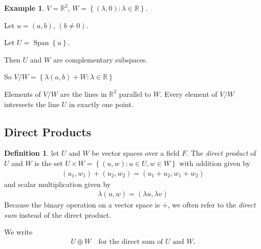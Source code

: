 \documentclass{article}
\theoremstyle{definition} \newtheorem*{definition}{Definition}
\newtheorem*{exmp}{Example} \newtheorem*{exmps}{Examples}
\newcommand{\reals}{\mathbb{R}} \newcommand{\rationals}{\mathbb{Q}}
\DeclareMathOperator{\Span}{Span}
\begin{document}
\begin{exmp}
  $V = \reals^2$, $W = \left\{ (\lambda, 0) : \lambda \in \reals \right\}$.
  
  Let $u = \left( a,b \right)$, $\left( b \neq 0 \right)$.

  Let $U = \Span\left\{ u \right\}$.

  Then $U$ and $W$ are complementary subspaces.


  So $V/W = \left\{ \lambda (a,b) + W : \lambda \in \reals \right\}$

  \begin{figure}[h]
    \centering
    \label{fig:exmpcompl}
  \end{figure}

  Elements of $V/W$ are the lines in $\reals^2$ parallel to $W$.
  Every element of $V/W$ intersects the line $U$ in exactly one point.
\end{exmp}

\subsection{Direct Products}

\begin{definition}
  let $U$ and $W$ be vector spaces over a field $F$. The \emph{direct product} of $U$ and $W$ is the set $U \times W = \left\{ (u,w) : u \in U, w \in W \right\}$ with addition given by 
  \begin{align*}
    (u_1, w_1) + (u_2,w_2) = (u_1 + u_2, w_1 + w_2)
  \end{align*}
  and scalar multiplication given by
  \begin{align*}
    \lambda(u, w) = (\lambda u, \lambda v)
  \end{align*}
  Because the binary operation on a vector space is $+$, we often
  refer to the \emph{direct sum} instead of the direct product.

  We write 
  \begin{align*}
    U \oplus W \quad \text{for the direct sum of } U \text{ and } W.
  \end{align*}
\end{definition}
\end{document}
